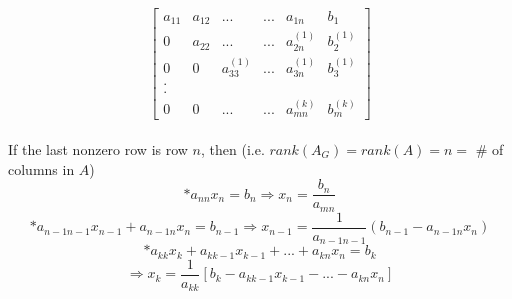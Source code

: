 \documentclass [12pt]{article}
\begin{document}
\begin{framed}
$$\begin{bmatrix}
a_{11}&a_{12}&...&...&a_{1n}&b_1\\
0&a_{22}&...&...&a_{2n}^{(1)}&b_2^{(1)}\\
0&0&a_{33}^{(1)}&...&a_{3n}^{(1)}&b_3^{(1)}\\
.\\
.\\
0&0&...&...&a_{mn}^{(k)}&b_m^{(k)}
\end{bmatrix}$$\\
If the last nonzero row is row $n$, then (i.e. $rank(A_G)=rank(A)=n=$ \# of columns in $A$)
\[*a_{nn}x_n=b_n\Rightarrow x_n=\frac{b_n}{a_{mn}}\]
\[*a_{n-1n-1}x_{n-1}+a_{n-1n}x_{n}=b_{n-1}\Rightarrow x_{n-1} = \frac{1}{a_{n-1n-1}}(b_{n-1}-a_{n-1n}x_{n})\]
\[*a_{kk}x_k+a_{kk-1}x_{k-1}+...+a_{kn}x_{n}=b_k\]
\[\Rightarrow x_k=\frac{1}{a_{kk}}[b_k-a_{kk-1}x_{k-1}-...-a_{kn}x_n]\]
\end{framed}
\end{document}
